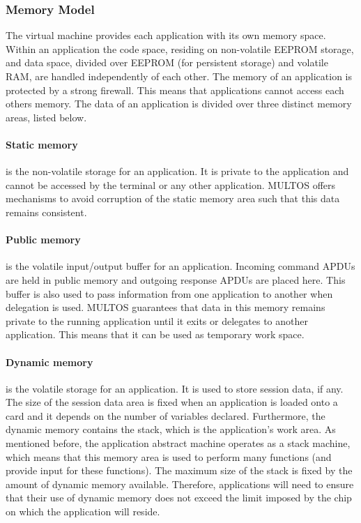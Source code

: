 \subsubsection{Memory Model}

The virtual machine provides each application with its own memory space. Within
an application the code space, residing on non-volatile EEPROM
 storage, and data space, divided over
EEPROM (for persistent storage) and volatile RAM, are handled independently of each other. The memory of an
application is protected by a strong firewall. This means that applications
cannot access each others memory. The data of an application is divided over
three distinct memory areas, listed below.

\paragraph{Static memory} is the non-volatile storage for an application. It is
private to the application and cannot be accessed by the terminal or any other
application. MULTOS offers mechanisms to avoid corruption of the static memory
area such that this data remains consistent.

\paragraph{Public memory} is the volatile input/output buffer for an
application. Incoming command APDUs are held in public memory and outgoing
response APDUs are placed here. This buffer is also used to pass information
from one application to another when delegation is used. MULTOS guarantees that
data in this memory remains private to the running application until it exits
or delegates to another application. This means that it can be used as
temporary work space.

\paragraph{Dynamic memory} is the volatile storage for an application. It is
used to store session data, if any. The size of the session data area is fixed
when an application is loaded onto a card and it depends on the number of
variables declared. Furthermore, the dynamic memory contains the stack, which
is the application's work area. As mentioned before, the application abstract
machine operates as a stack machine, which means that this memory area is used
to perform many functions (and provide input for these functions). The maximum
size of the stack is fixed by the amount of dynamic memory available. Therefore,
applications will need to ensure that their use of dynamic memory does not
exceed the limit imposed by the chip~\cite{MIR2012} on which the application
will reside.

